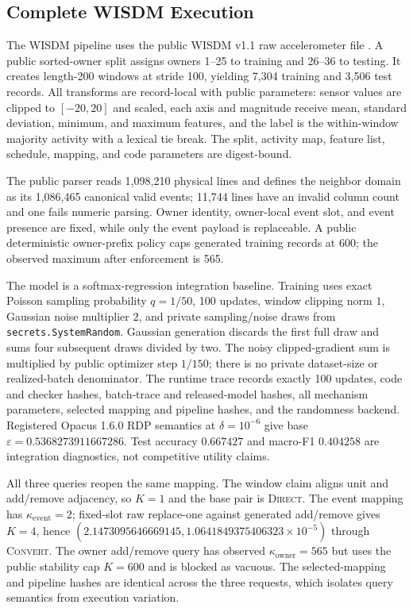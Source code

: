 \documentclass[letterpaper]{article} %
\newcommand{\Direct}{\textsc{Direct}}
\newcommand{\Convert}{\textsc{Convert}}
\newcommand{\ke}{\kappa_{\mathrm{event}}}
\newcommand{\ko}{\kappa_{\mathrm{owner}}}
\begin{document}
\subsection{Complete WISDM Execution}

The WISDM pipeline uses the public WISDM v1.1 raw accelerometer file
\citep{kwapisz2011activity}.  A public sorted-owner split assigns owners
1--25 to training and 26--36 to testing.  It creates length-200 windows at
stride 100, yielding 7,304 training and 3,506 test records.  All transforms
are record-local with public parameters: sensor values are clipped to
$[-20,20]$ and scaled, each axis and magnitude receive mean, standard
deviation, minimum, and maximum features, and the label is the within-window
majority activity with a lexical tie break.  The split, activity map, feature
list, schedule, mapping, and code parameters are digest-bound.

The public parser reads 1,098,210 physical lines and defines the neighbor
domain as its 1,086,465 canonical valid events; 11,744 lines have an invalid
column count and one fails numeric parsing.  Owner identity, owner-local event
slot, and event presence are fixed, while only the event payload is
replaceable.  A public deterministic owner-prefix policy caps generated
training records at 600; the observed maximum after enforcement is 565.

The model is a softmax-regression integration baseline.  Training uses exact
Poisson sampling probability $q=1/50$, 100 updates, window clipping norm
$1$, Gaussian noise multiplier $2$, and private sampling/noise draws from
\texttt{secrets.SystemRandom}.  Gaussian generation discards the first full
draw and sums four subsequent draws divided by two.  The noisy clipped-gradient
sum is multiplied by public optimizer step $1/150$; there is no private
dataset-size or realized-batch denominator.  The runtime trace records exactly
100 updates, code and checker hashes, batch-trace and released-model hashes,
all mechanism parameters, selected mapping and pipeline hashes, and the
randomness backend.  Registered Opacus 1.6.0 RDP semantics
\citep{yousefpour2021opacus}
at $\delta=10^{-6}$ give base
$\varepsilon=0.5368273911667286$.  Test accuracy $0.667427$ and macro-F1
$0.404258$ are integration diagnostics, not competitive utility claims.

All three queries reopen the same mapping.  The window claim aligns unit and
add/remove adjacency, so $K=1$ and the base pair is \Direct{}.  The event
mapping has $\ke=2$; fixed-slot raw replace-one against generated add/remove
gives $K=4$, hence
$(2.1473095646669145,1.0641849375406323\times10^{-5})$ through
\Convert{}.  The owner add/remove query has observed $\ko=565$ but uses the
public stability cap $K=600$ and is blocked as vacuous.  The selected-mapping
and pipeline hashes are identical across the three requests, which isolates
query semantics from execution variation.
\end{document}
